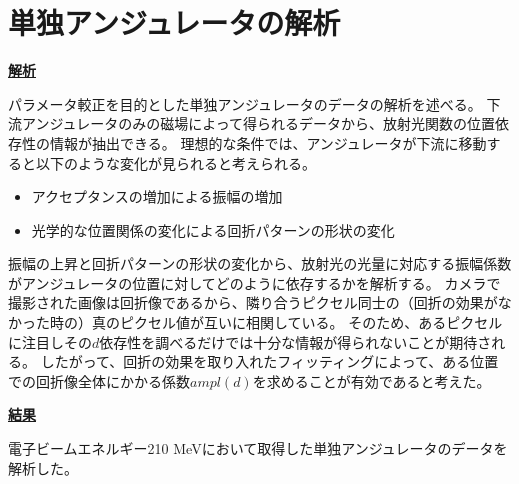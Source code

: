 \documentclass[a4paper,11pt,uplatex]{jsbook}
\begin{document}
\section{単独アンジュレータの解析}
\noindent \textbf{\underline{解析}}\par
パラメータ較正を目的とした単独アンジュレータのデータの解析を述べる。
下流アンジュレータのみの磁場によって得られるデータから、放射光関数の位置依存性の情報が抽出できる。
理想的な条件では、アンジュレータが下流に移動すると以下のような変化が見られると考えられる。
\begin{itemize}
  \item アクセプタンスの増加による振幅の増加
  \item 光学的な位置関係の変化による回折パターンの形状の変化
\end{itemize}

振幅の上昇と回折パターンの形状の変化から、放射光の光量に対応する振幅係数がアンジュレータの位置に対してどのように依存するかを解析する。
カメラで撮影された画像は回折像であるから、隣り合うピクセル同士の（回折の効果がなかった時の）真のピクセル値が互いに相関している。
そのため、あるピクセルに注目しその$d$依存性を調べるだけでは十分な情報が得られないことが期待される。
したがって、回折の効果を取り入れたフィッティングによって、ある位置での回折像全体にかかる係数$ampl(d)$を求めることが有効であると考えた。

\noindent \textbf{\underline{結果}}\par
電子ビームエネルギー210 MeVにおいて取得した単独アンジュレータのデータを解析した。
\end{document}
